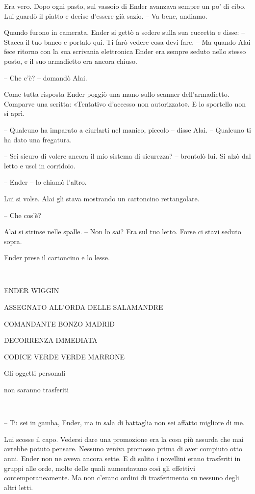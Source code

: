 {Era vero. Dopo ogni pasto, sul vassoio di Ender avanzava sempre un po'
	di cibo. Lui guardò il piatto e decise d'essere già sazio. -- Va bene,
	andiamo.}

{Quando furono in camerata, Ender si gettò a sedere sulla sua cuccetta e
	disse: -- Stacca il tuo banco e portalo qui. Ti farò vedere cosa devi
	fare. -- Ma quando Alai fece ritorno con la sua scrivania elettronica
	Ender era sempre seduto nello stesso posto, e il suo armadietto era
	ancora chiuso.}

{-- Che c'è? -- domandò Alai.}

{Come tutta risposta Ender poggiò una mano sullo scanner
	dell'armadietto. Comparve una scritta: «Tentativo d'accesso non
	autorizzato». E lo sportello non si aprì.}

{-- Qualcuno ha imparato a ciurlarti nel manico, piccolo -- disse Alai.
	-- Qualcuno ti ha dato una fregatura.}

{-- Sei sicuro di volere ancora il mio sistema di sicurezza? -- brontolò
	lui. Si alzò dal letto e uscì in corridoio.}

{-- Ender -- lo chiamò l'altro.}

{Lui si volse. Alai gli stava mostrando un cartoncino rettangolare.}

{-- Che cos'è?}

{Alai si strinse nelle spalle. -- Non lo sai? Era sul tuo letto. Forse
	ci stavi seduto sopra.}

{Ender prese il cartoncino e lo lesse.}

{~}

\begin{center}
	{ENDER WIGGIN}

{ASSEGNATO ALL'ORDA DELLE SALAMANDRE}

{COMANDANTE BONZO MADRID}

{DECORRENZA IMMEDIATA}

{CODICE VERDE VERDE MARRONE}

{Gli oggetti personali}

{non saranno trasferiti}
\end{center}

{~}

{-- Tu sei in gamba, Ender, ma in sala di battaglia non sei affatto
	migliore di me.}

{Lui scosse il capo. Vedersi dare una promozione era la cosa più assurda
	che mai avrebbe potuto pensare. Nessuno veniva promosso prima di aver
	compiuto otto anni. Ender non ne aveva ancora sette. E di solito i
	novellini erano trasferiti in gruppi alle orde, molte delle quali
	aumentavano così gli effettivi contemporaneamente. Ma non c'erano ordini
	di trasferimento su nessuno degli altri letti.}

